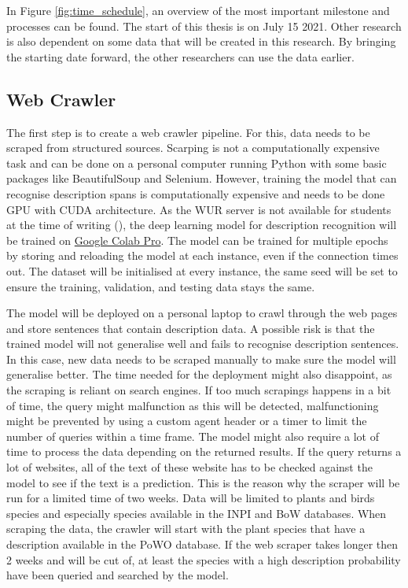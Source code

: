 \documentclass[a4paper, 12pt, oneside]{book} %
\begin{document}
In Figure \ref{fig:time_schedule}, an overview of the most important milestone and processes can be found.
The start of this thesis is on July 15 2021.
Other research is also dependent on some data that will be created in this research.
By bringing the starting date forward, the other researchers can use the data earlier.


\subsection{Web Crawler}
The first step is to create a web crawler pipeline. 
For this, data needs to be scraped from structured sources.
Scarping is not a computationally expensive task and can be done on a personal computer running Python with some basic packages like BeautifulSoup and Selenium.
However, training the model that can recognise description spans is computationally expensive and needs to be done GPU with CUDA architecture.
As the WUR server is not available for students at the time of writing (\thedate), the deep learning model for description recognition will be trained on \href{https://colab.research.google.com/}{Google Colab Pro}. 
The model can be trained for multiple epochs by storing and reloading the model at each instance, even if the connection times out.
The dataset will be initialised at every instance, the same seed will be set to ensure the training, validation, and testing data stays the same.


The model will be deployed on a personal laptop to crawl through the web pages and store sentences that contain description data.
A possible risk is that the trained model will not generalise well and fails to recognise description sentences.
In this case, new data needs to be scraped manually to make sure the model will generalise better.
The time needed for the deployment might also disappoint, as the scraping is reliant on search engines.
If too much scrapings happens in a bit of time, the query might malfunction as this will be detected, malfunctioning might be prevented by using a custom agent header or a timer to limit the number of queries within a time frame.
The model might also require a lot of time to process the data depending on the returned results.
If the query returns a lot of websites, all of the text of these website has to be checked against the model to see if the text is a prediction.
This is the reason why the scraper will be run for a limited time of two weeks.
Data will be limited to plants and birds species and especially species available in the INPI and BoW databases.
When scraping the data, the crawler will start with the plant species that have a description available in the PoWO database. 
If the web scraper takes longer then 2 weeks and will be cut of, at least the species with a high description probability have been queried and searched by the model.
\end{document}
